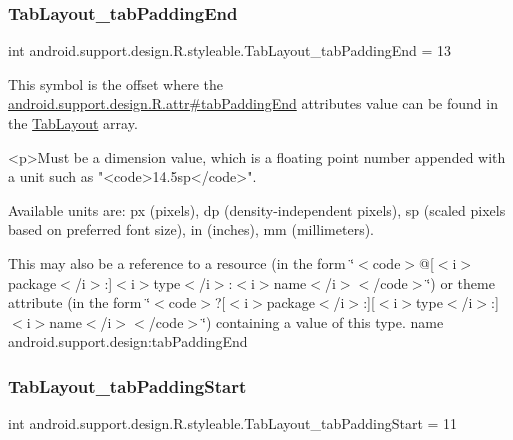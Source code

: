 \subsubsection{\texorpdfstring{Tab\+Layout\+\_\+tab\+Padding\+End}{TabLayout\_tabPaddingEnd}}
{\footnotesize\ttfamily int android.\+support.\+design.\+R.\+styleable.\+Tab\+Layout\+\_\+tab\+Padding\+End = 13\hspace{0.3cm}{\ttfamily [static]}}

This symbol is the offset where the \hyperlink{classandroid_1_1support_1_1design_1_1R_1_1attr_a0c324f3c1cbd6bf57bac7ae27b2c4d0b}{android.\+support.\+design.\+R.\+attr\#tab\+Padding\+End} attribute\textquotesingle{}s value can be found in the \hyperlink{classandroid_1_1support_1_1design_1_1R_1_1styleable_a514b47b47f600f9421b65f4f0aa832d6}{Tab\+Layout} array.

\begin{DoxyVerb}      <p>Must be a dimension value, which is a floating point number appended with a unit such as "<code>14.5sp</code>".
\end{DoxyVerb}
 Available units are\+: px (pixels), dp (density-\/independent pixels), sp (scaled pixels based on preferred font size), in (inches), mm (millimeters). 

This may also be a reference to a resource (in the form \char`\"{}$<$code$>$@\mbox{[}$<$i$>$package$<$/i$>$\+:\mbox{]}$<$i$>$type$<$/i$>$\+:$<$i$>$name$<$/i$>$$<$/code$>$\char`\"{}) or theme attribute (in the form \char`\"{}$<$code$>$?\mbox{[}$<$i$>$package$<$/i$>$\+:\mbox{]}\mbox{[}$<$i$>$type$<$/i$>$\+:\mbox{]}$<$i$>$name$<$/i$>$$<$/code$>$\char`\"{}) containing a value of this type.  name android.\+support.\+design\+:tab\+Padding\+End \mbox{\label{classandroid_1_1support_1_1design_1_1R_1_1styleable_af09be2b7a72af9b14738fc83b314b129}} 
\subsubsection{\texorpdfstring{Tab\+Layout\+\_\+tab\+Padding\+Start}{TabLayout\_tabPaddingStart}}
{\footnotesize\ttfamily int android.\+support.\+design.\+R.\+styleable.\+Tab\+Layout\+\_\+tab\+Padding\+Start = 11\hspace{0.3cm}{\ttfamily [static]}}


